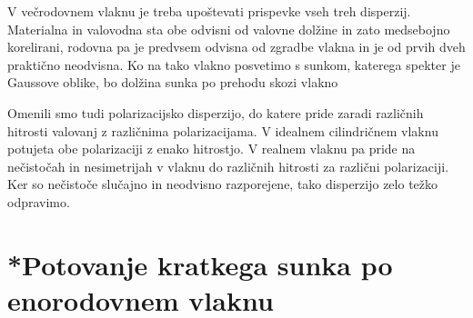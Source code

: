 V večrodovnem vlaknu je treba upoštevati prispevke vseh treh disperzij. Materialna
in valovodna sta obe odvisni od valovne dolžine in zato medsebojno korelirani, rodovna pa 
je predvsem odvisna od zgradbe vlakna in je od prvih dveh praktično neodvisna. Ko na 
tako vlakno posvetimo s sunkom, katerega spekter je Gaussove oblike, bo dolžina 
sunka po prehodu skozi vlakno

\begin{remark}
 Omenili smo tudi polarizacijsko disperzijo, do katere pride zaradi različnih hitrosti valovanj
 z različnima polarizacijama. V idealnem cilindričnem vlaknu potujeta obe polarizaciji
 z enako hitrostjo. V realnem vlaknu pa 
 pride na nečistočah in nesimetrijah v vlaknu do različnih hitrosti za različni polarizaciji. 
 Ker so nečistoče slučajno in neodvisno razporejene, tako disperzijo zelo težko odpravimo.
\end{remark}

\section{*Potovanje kratkega sunka po enorodovnem vlaknu}
\label{chap:sunvl}
